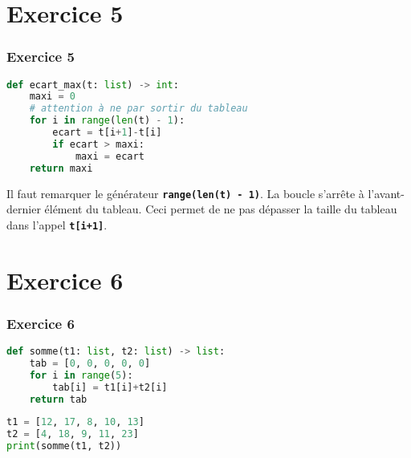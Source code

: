 \documentclass[svgnames,11pt]{beamer}
\begin{document}
\section{Exercice 5}
\begin{frame}[fragile]
    \frametitle{Exercice 5}

\begin{lstlisting}[language=Python , basicstyle=\ttfamily\small, xleftmargin=2em, xrightmargin=2em]
def ecart_max(t: list) -> int:
    maxi = 0
    # attention à ne par sortir du tableau
    for i in range(len(t) - 1):
        ecart = t[i+1]-t[i]
        if ecart > maxi:
            maxi = ecart
    return maxi
\end{lstlisting}

\begin{aretenir}[Observation]
Il faut remarquer le générateur \textbf{\texttt{range(len(t) - 1)}}. La boucle s'arrête à l'avant-dernier élément du tableau. Ceci permet de ne pas dépasser la taille du tableau dans l'appel \textbf{\texttt{t[i+1]}}.
\end{aretenir}
\end{frame}
\section{Exercice 6}
\begin{frame}[fragile]
    \frametitle{Exercice 6}

\begin{lstlisting}[language=Python , basicstyle=\ttfamily\small, xleftmargin=2em, xrightmargin=2em]
def somme(t1: list, t2: list) -> list:
    tab = [0, 0, 0, 0, 0]
    for i in range(5):
        tab[i] = t1[i]+t2[i]
    return tab
\end{lstlisting}

\begin{center}
    \begin{lstlisting}[language=Python , basicstyle=\ttfamily\small, xleftmargin=2em, xrightmargin=2em]
t1 = [12, 17, 8, 10, 13]
t2 = [4, 18, 9, 11, 23]
print(somme(t1, t2))
\end{lstlisting}
    \label{CODE}
    \end{center}
\end{frame}
\end{document}
